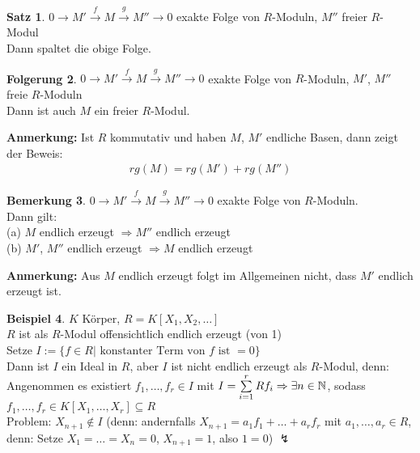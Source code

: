 \documentclass[10pt,a4paper,numbers=endperiod]{scrreprt}
\theoremstyle{definition}
\newtheorem{satz}{Satz}[section]
\newtheorem{bem}[satz]{Bemerkung}
\newtheorem{bsp}[satz]{Beispiel}
\newtheorem{folg}[satz]{Folgerung}
\def\NN{{\mathbb N}}
\begin{document}
\begin{satz}
	$0 \longrightarrow M' \overset{f}{\longrightarrow} M \overset{g}{\longrightarrow} M'' \rightarrow 0$ exakte Folge von $R$-Moduln, $M''$ freier $R$-Modul\\
	Dann spaltet die obige Folge.
\end{satz}

\begin{folg}
	$0 \longrightarrow M' \overset{f}{\longrightarrow} M \overset{g}{\longrightarrow} M'' \rightarrow 0$ exakte Folge von $R$-Moduln, $M'$, $M''$ freie $R$-Moduln\\
	Dann ist auch $M$ ein freier $R$-Modul.
\end{folg}

\textbf{Anmerkung:} Ist $R$ kommutativ und haben $M$, $M'$ endliche Basen, dann zeigt der Beweis:
\begin{align*}
 	rg(M) = rg(M') + rg(M'')
\end{align*}

\begin{bem}
	$0 \longrightarrow M' \overset{f}{\longrightarrow} M \overset{g}{\longrightarrow} M'' \longrightarrow 0$ exakte Folge von $R$-Moduln.\\
	Dann gilt:\\
	(a) $M$ endlich erzeugt $\Rightarrow M''$ endlich erzeugt\\
	(b) $M'$, $M''$ endlich erzeugt $\Rightarrow M$ endlich erzeugt
\end{bem}

\textbf{Anmerkung:} Aus $M$ endlich erzeugt folgt im Allgemeinen nicht, dass $M'$ endlich erzeugt ist.

\begin{bsp}
	$K$ Körper, $R = K[X_1,X_2, \ldots]$\\
	$R$ ist als $R$-Modul offensichtlich endlich erzeugt (von 1)\\
	Setze $I := \{f \in R| \text{ konstanter Term von $f$ ist } = 0\}$\\
	Dann ist $I$ ein Ideal in $R$, aber $I$ ist nicht endlich erzeugt als $R$-Modul, denn:\\
	Angenommen es existiert $f_1, \ldots, f_r \in I$ mit $I = \sum\limits_{i = 1}^r Rf_i\\
	\Rightarrow \exists n \in \NN$, sodass $f_1, \ldots, f_r \in K[X_1, \ldots, X_r] \subseteq R$\\
	Problem: $X_{n+1} \notin I$ (denn: andernfalls $X_{n+1} = a_1f_1+ \ldots + a_rf_r$ mit $a_1, \ldots, a_r \in R$, denn: Setze $X_1 = \ldots = X_n = 0$, $X_{n+1} = 1$, also $1 = 0$) $\lightning$ 
\end{bsp}
\end{document}
